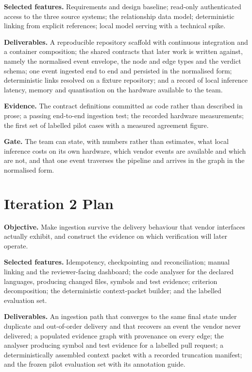 \textbf{Selected features.} Requirements and design baseline; read-only
authenticated access to the three source systems; the relationship data model;
deterministic linking from explicit references; local model serving with a
technical spike.

\textbf{Deliverables.} A reproducible repository scaffold with continuous
integration and a container composition; the shared contracts that later work
is written against, namely the normalised event envelope, the node and edge
types and the verdict schema; one event ingested end to end and persisted in the
normalised form; deterministic links resolved on a fixture repository; and a
record of local inference latency, memory and quantisation on the hardware
available to the team.

\textbf{Evidence.} The contract definitions committed as code rather than
described in prose; a passing end-to-end ingestion test; the recorded hardware
measurements; the first set of labelled pilot cases with a measured agreement
figure.

\textbf{Gate.} The team can state, with numbers rather than estimates, what
local inference costs on its own hardware, which vendor events are available and
which are not, and that one event traverses the pipeline and arrives in the
graph in the normalised form.

\section{Iteration 2 Plan}

\textbf{Objective.} Make ingestion survive the delivery behaviour that vendor
interfaces actually exhibit, and construct the evidence on which verification
will later operate.

\textbf{Selected features.} Idempotency, checkpointing and reconciliation;
manual linking and the reviewer-facing dashboard; the code analyser for the
declared languages, producing changed files, symbols and test evidence;
criterion decomposition; the deterministic context-packet builder; and the
labelled evaluation set.

\textbf{Deliverables.} An ingestion path that converges to the same final state
under duplicate and out-of-order delivery and that recovers an event the vendor
never delivered; a populated evidence graph with provenance on every edge; the
analyser producing symbol and test evidence for a labelled pull request; a
deterministically assembled context packet with a recorded truncation manifest;
and the frozen pilot evaluation set with its annotation guide.

